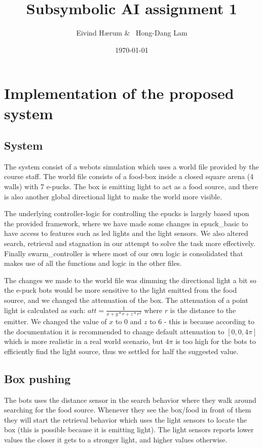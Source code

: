 \documentclass[12pt, a4paper]{article}
\title{Subsymbolic AI assignment 1}
\author{Eivind Hærum \& \ Hong-Dang Lam}
\date{\today} %
\begin{document}
\maketitle
% 
% 
\newpage

\tableofcontents
{}
\newpage

\section{Implementation of the proposed system}

\subsection{System}
The system consist of a webots simulation which uses a world file provided by the course staff. The world file consists of a food-box inside a closed square arena (4 walls) with 7 e-pucks. The box is emitting light to act as a food source, and there is also another global directional light to make the world more visible.


The underlying controller-logic for controlling the epucks is largely based upon the provided framework, where we have made some changes in epuck\_basic to have access to features such as led lights and the light sensors. We also altered search, retrieval and stagnation in our attempt to solve the task more effectively. Finally swarm\_controller is where most of our own logic is consolidated that makes use of all the functions and logic in the other files. 

The changes we made to the world file was dimming the directional light a bit so the e-puck bots would be more sensitive to the light emitted from the food source, and we changed the attenuation of the box. The attenuation of a point light is calculated as such: $ att = \frac{1}{x+y*r+z*r^2} $ where $r$ is the distance to the emitter. We changed the value of $x$ to 0 and $z$ to 6 - this is because according to the documentation it is recommended to change default attenuation to $[0,0,4\pi]$ which is more realistic in a real world scenario, but $4\pi$ is too high for the bots to efficiently find the light source, thus we settled for half the suggested value.  
\subsection{Box pushing}
The bots uses the distance sensor in the search behavior where they walk around searching for the food source. Whenever they see the box/food in front of them they will start the retrieval behavior which uses the light sensors to locate the box (this is possible because it is emitting light). The light sensors reports lower values the closer it gets to a stronger light, and higher values otherwise.
\end{document}
